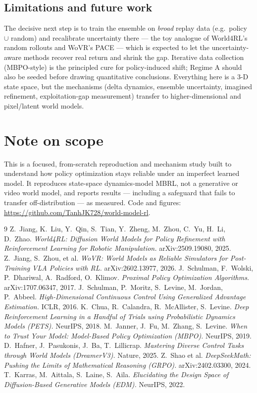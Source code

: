 \documentclass[11pt]{article}
\begin{document}
\subsection{Limitations and future work}
The decisive next step is to train the ensemble on \emph{broad} replay data (e.g.\ policy $\cup$ random)
and recalibrate uncertainty there --- the toy analogue of World4RL's random rollouts and WoVR's PACE ---
which is expected to let the uncertainty-aware methods recover real return and shrink the gap. Iterative
data collection (MBPO-style) is the principled cure for policy-induced shift; Regime A should also be
seeded before drawing quantitative conclusions. Everything here is a 3-D state space, but the mechanisms
(delta dynamics, ensemble uncertainty, imagined refinement, exploitation-gap measurement) transfer to
higher-dimensional and pixel/latent world models.

\section*{Note on scope}
This is a focused, from-scratch reproduction and mechanism study built to understand how policy
optimization stays reliable under an imperfect learned model. It reproduces state-space dynamics-model
MBRL, not a generative or video world model, and reports results --- including a safeguard that fails to
transfer off-distribution --- as measured. Code and figures:
\url{https://github.com/TanhJK728/world-model-rl}.

\begin{thebibliography}{9}
 Z.\ Jiang, K.\ Liu, Y.\ Qin, S.\ Tian, Y.\ Zheng, M.\ Zhou, C.\ Yu, H.\ Li,
D.\ Zhao. \emph{World4RL: Diffusion World Models for Policy Refinement with Reinforcement Learning for
Robotic Manipulation.} arXiv:2509.19080, 2025.
 Z.\ Jiang, S.\ Zhou, et al. \emph{WoVR: World Models as Reliable Simulators for
Post-Training VLA Policies with RL.} arXiv:2602.13977, 2026.
 J.\ Schulman, F.\ Wolski, P.\ Dhariwal, A.\ Radford, O.\ Klimov. \emph{Proximal Policy
Optimization Algorithms.} arXiv:1707.06347, 2017.
 J.\ Schulman, P.\ Moritz, S.\ Levine, M.\ Jordan, P.\ Abbeel. \emph{High-Dimensional
Continuous Control Using Generalized Advantage Estimation.} ICLR, 2016.
 K.\ Chua, R.\ Calandra, R.\ McAllister, S.\ Levine. \emph{Deep Reinforcement Learning in a
Handful of Trials using Probabilistic Dynamics Models (PETS).} NeurIPS, 2018.
 M.\ Janner, J.\ Fu, M.\ Zhang, S.\ Levine. \emph{When to Trust Your Model: Model-Based
Policy Optimization (MBPO).} NeurIPS, 2019.
 D.\ Hafner, J.\ Pasukonis, J.\ Ba, T.\ Lillicrap. \emph{Mastering Diverse Control Tasks
through World Models (DreamerV3).} Nature, 2025.
 Z.\ Shao et al. \emph{DeepSeekMath: Pushing the Limits of Mathematical Reasoning (GRPO).}
arXiv:2402.03300, 2024.
 T.\ Karras, M.\ Aittala, S.\ Laine, S.\ Aila. \emph{Elucidating the Design Space of
Diffusion-Based Generative Models (EDM).} NeurIPS, 2022.
\end{thebibliography}
\end{document}
